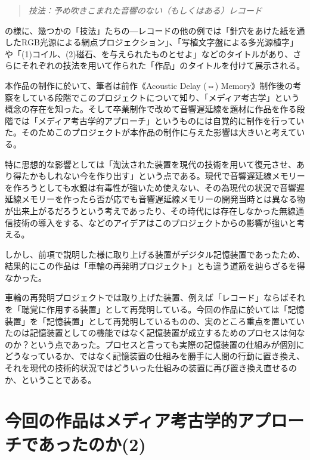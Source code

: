 \documentclass[a4paper,report]{jsbook}
\begin{document}
\begin{quote}
\emph{技法：予め吹きこまれた音響のない（もしくはある）レコード}
\end{quote}

の様に、幾つかの「技法」たちの―レコードの他の例では「針穴をあけた紙を通したRGB光源による網点プロジェクション」、「写植文字盤による多光源植字」や「(1)コイル、(2)磁石、を与えられたものとせよ」などのタイトルがあり、さらにそれぞれの技法を用いて作られた「作品」のタイトルを付けて展示される。

本作品の制作に於いて、筆者は前作《Acoustic Delay (⇔)
Memory》制作後の考察をしている段階でこのプロジェクトについて知り、「メディア考古学」という概念の存在を知った。そして卒業制作で改めて音響遅延線を題材に作品を作る段階では「メディア考古学的アプローチ」というものには自覚的に制作を行っていた。そのためこのプロジェクトが本作品の制作に与えた影響は大きいと考えている。

特に思想的な影響としては「淘汰された装置を現代の技術を用いて復元させ、あり得たかもしれない今を作り出す」という点である。現代で音響遅延線メモリーを作ろうとしても水銀は有毒性が強いため使えない、その為現代の状況で音響遅延線メモリーを作ったら否が応でも音響遅延線メモリーの開発当時とは異なる物が出来上がるだろうという考えであったり、その時代には存在しなかった無線通信技術の導入をする、などのアイデアはこのプロジェクトからの影響が強いと考える。

しかし、前項で説明した様に取り上げる装置がデジタル記憶装置であったため、結果的にこの作品は「車輪の再発明プロジェクト」とも違う道筋を辿らざるを得なかった。

車輪の再発明プロジェクトでは取り上げた装置、例えば「レコード」ならばそれを「聴覚に作用する装置」として再発明している。今回の作品に於いては「記憶装置」を「記憶装置」として再発明しているものの、実のところ重点を置いていたのは記憶装置としての機能ではなく記憶装置が成立するためのプロセスは何なのか？という点であった。プロセスと言っても実際の記憶装置の仕組みが個別にどうなっているか、ではなく記憶装置の仕組みを勝手に人間の行動に置き換え、それを現代の技術的状況ではどういった仕組みの装置に再び置き換え直せるのか、ということである。

\section{今回の作品はメディア考古学的アプローチであったのか(2)}\label{ux4ecaux56deux306eux4f5cux54c1ux306fux30e1ux30c7ux30a3ux30a2ux8003ux53e4ux5b66ux7684ux30a2ux30d7ux30edux30fcux30c1ux3067ux3042ux3063ux305fux306eux304b2}
\end{document}

